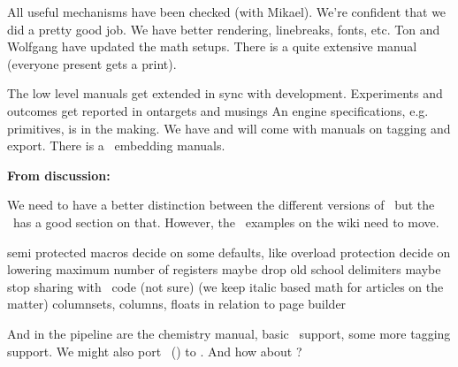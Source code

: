 \stoptitle

\starttitle[title=Math]

\startitemize
\startitem All useful mechanisms have been checked (with Mikael). \stopitem
\startitem We're confident that we did a pretty good job. \stopitem
\startitem We have better rendering, linebreaks, fonts, etc. \stopitem
\startitem Ton and Wolfgang have updated the math setups. \stopitem
\startitem There is a quite extensive manual (everyone present gets a  print). \stopitem
\stopitemize

\stoptitle

\starttitle[title=Manuals]

\startitemize
\startitem The low level manuals get extended in sync with development. \stopitem
\startitem Experiments and outcomes get reported in ontargets and musings \stopitem
\startitem An engine specifications, e.g. primitives, is in the making. \stopitem
\startitem We have and will come with manuals on tagging and export. \stopitem
\startitem There is a \PDF\ embedding manuals. \stopitem
\stopitemize

{\bf From discussion:}

We need to have a better distinction between the different versions of \CONTEXT\
but the \WIKI\ has a good section on that. However, the \MKII\ examples on the
wiki need to move.

\stoptitle

\starttitle[title=Todo]

\startitemize
    \startitem semi protected macros \stopitem
    \startitem decide on some defaults, like overload protection \stopitem
    \startitem decide on lowering maximum number of registers \stopitem
    \startitem maybe drop old school delimiters \stopitem
    \startitem maybe stop sharing with \MKIV\ code (not sure) \stopitem
    \startitem (we keep italic based math for articles on the matter) \stopitem
    \startitem columnsets, columns, floats in relation to page builder \stopitem
\stopitemize

And in the pipeline are the chemistry manual, basic \CSL\ support, some more
tagging support. We might also port \TEXUTIL\ (\MKII) to \LUA. And how about
\LUAJITTEX ?

\stoptitle

\stopdocument

